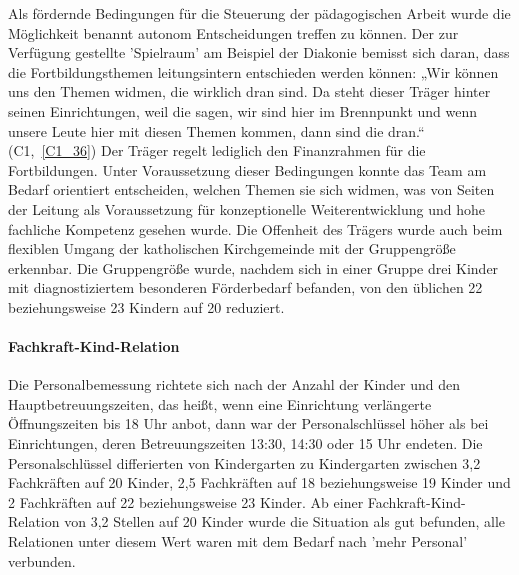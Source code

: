 Als fördernde Bedingungen für die Steuerung der pädagogischen Arbeit wurde die Möglichkeit benannt autonom Entscheidungen treffen zu können. 
Der zur Verfügung gestellte 'Spielraum' am Beispiel der Diakonie bemisst sich daran, dass die Fortbildungsthemen leitungsintern entschieden werden können: „Wir können uns den Themen widmen, die wirklich dran sind. Da steht dieser Träger hinter seinen Einrichtungen, weil die sagen, wir sind hier im Brennpunkt und wenn unsere Leute hier mit diesen Themen kommen, dann sind die dran.“ (C1,~\ref{C1_36}) Der Träger regelt lediglich den Finanzrahmen für die Fortbildungen. Unter Voraussetzung dieser Bedingungen konnte das Team am Bedarf orientiert entscheiden, welchen Themen sie sich widmen, was von Seiten der Leitung als Voraussetzung für konzeptionelle Weiterentwicklung und hohe fachliche Kompetenz gesehen wurde. 
Die Offenheit des Trägers wurde auch beim flexiblen Umgang der katholischen Kirchgemeinde mit der Gruppengröße erkennbar. Die Gruppengröße wurde, nachdem sich in einer Gruppe drei Kinder mit diagnostiziertem besonderen Förderbedarf befanden, von den üblichen 22 beziehungsweise 23 Kindern auf 20 reduziert. 

\paragraph{Fachkraft-Kind-Relation}
Die Personalbemessung richtete sich nach der Anzahl der Kinder und den Hauptbetreuungszeiten, das heißt, wenn eine Einrichtung verlängerte Öffnungszeiten bis 18 Uhr anbot, dann war der Personalschlüssel höher als bei Einrichtungen, deren Betreuungszeiten 13:30, 14:30 oder 15 Uhr endeten. Die Personalschlüssel differierten von Kindergarten zu Kindergarten zwischen 3,2 Fachkräften auf 20 Kinder, 2,5 Fachkräften auf 18 beziehungsweise 19 Kinder und 2 Fachkräften auf 22 beziehungsweise 23 Kinder. Ab einer Fachkraft-Kind-Relation von 3,2 Stellen auf 20 Kinder wurde die Situation als gut befunden, alle Relationen unter diesem Wert waren mit dem Bedarf nach 'mehr Personal' verbunden.     

